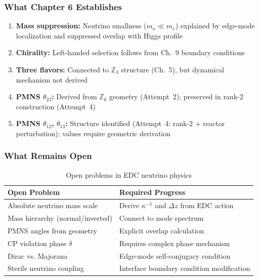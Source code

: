 \subsubsection{What Chapter 6 Establishes}

\begin{tcolorbox}[colback=green!5, colframe=green!50!black,
    title=\textbf{Chapter 6 Summary}]
\begin{enumerate}[nosep]
    \item \textbf{Mass suppression:} Neutrino smallness ($m_\nu \ll m_e$)
          explained by edge-mode localization and suppressed overlap with
          Higgs profile \tagDc{}
    \item \textbf{Chirality:} Left-handed selection follows from Ch.~9
          boundary conditions \tagDc{}
    \item \textbf{Three flavors:} Connected to $\mathbb{Z}_3$ structure
          (Ch.~5), but dynamical mechanism not derived \tagI{}
    \item \textbf{PMNS $\theta_{23}$:} Derived from $\mathbb{Z}_6$ geometry
          (Attempt~2); preserved in rank-2 construction (Attempt~4) \tagDc{}
    \item \textbf{PMNS $\theta_{12}$, $\theta_{13}$:} Structure identified
          (Attempt~4: rank-2 + reactor perturbation); values require geometric derivation \tagI{}
\end{enumerate}
\end{tcolorbox}

\subsubsection{What Remains Open}

\begin{table}[ht]
\centering
\caption{Open problems in EDC neutrino physics}
\label{tab:ch6_open}
\begin{tabular}{p{5.5cm}p{5.5cm}}
\toprule
\textbf{Open Problem} & \textbf{Required Progress} \\
\midrule
Absolute neutrino mass scale & Derive $\kappa^{-1}$ and $\Delta z$ from EDC action \\
Mass hierarchy (normal/inverted) & Connect to mode spectrum \\
PMNS angles from geometry & Explicit overlap calculation \\
CP violation phase $\delta$ & Requires complex phase mechanism \\
Dirac vs. Majorana & Edge-mode self-conjugacy condition \\
Sterile neutrino coupling & Interface boundary condition modification \\
\bottomrule
\end{tabular}
\end{table}

